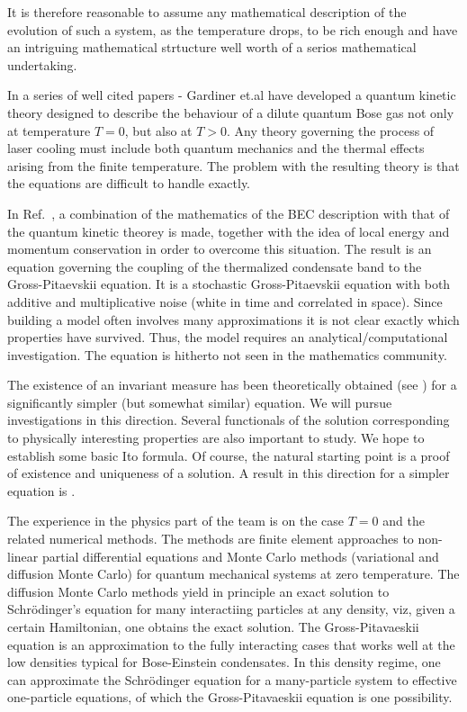 \documentclass[a4paper,12pt,twoside]{article}
\begin{document}
 
It is therefore reasonable to assume any mathematical description of the evolution
of such a system, as the temperature drops, to be rich enough and have an intriguing mathematical strtucture well
worth of a serios mathematical undertaking. 


In a series of well cited papers \cite{G1}-\cite{G6} Gardiner et.al  have developed a quantum kinetic theory designed to describe 
the behaviour of a dilute quantum Bose gas not only at temperature $T=0$, but also at $T>0$. 
Any theory governing the process of laser cooling 
must include both quantum mechanics and the thermal effects arising from the finite temperature. 
The problem with the resulting theory is that the equations are 
difficult to handle exactly.

In Ref.~\cite{GP}, a combination of the mathematics of the BEC description with that of the quantum kinetic theorey is made, 
together with the idea of local energy and momentum conservation in order 
to overcome this situation. 
The result is an equation governing the coupling of the thermalized condensate band to the
Gross-Pitaevskii equation.
It is a stochastic Gross-Pitaevskii equation with both additive and multiplicative noise
(white in time and correlated in space).
Since building a model often involves many approximations it is not clear exactly which
properties have survived. Thus, the model
requires an analytical/computational investigation.
The equation is hitherto not seen in the mathematics community.  


The existence of an invariant measure has been theoretically obtained (see \cite{DO}) 
for a significantly simpler (but somewhat similar) equation. We will pursue investigations in
this direction.
Several functionals of the solution corresponding to physically interesting properties  are
also important to study.  
We hope to establish some basic Ito formula.
Of course, the natural starting point is a proof of existence and uniqueness of a solution.
A result in this direction for a simpler equation is \cite{BD2}.

The experience in the physics part of the team is on the case $T=0$ and the related numerical
methods. The methods are finite element approaches to  non-linear
partial differential equations and Monte Carlo methods (variational and diffusion Monte Carlo)
for quantum mechanical systems
at zero temperature. The diffusion Monte Carlo methods yield in principle an exact solution
to Schr\"odinger's equation
for many interactiing particles at any density, viz, given a certain Hamiltonian, one obtains the exact solution.
The Gross-Pitavaeskii equation is an approximation to the fully interacting cases that works well at the low
densities typical for Bose-Einstein condensates. 
In this density regime, one can approximate the Schr\"odinger equation for a many-particle system to effective
one-particle equations, of which the Gross-Pitavaeskii equation is one possibility. 
 
\end{document}
